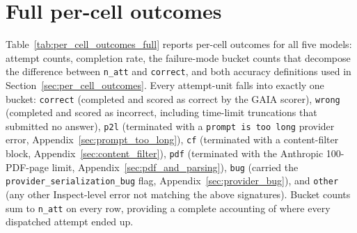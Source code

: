 \documentclass[10pt]{article} %
\begin{document}
\section{Full per-cell outcomes}\label{app:per_cell_outcomes_full}

    Table~\ref{tab:per_cell_outcomes_full} reports per-cell outcomes for all five models: attempt counts, completion rate, the failure-mode bucket counts that decompose the difference between \texttt{n\_att} and \texttt{correct}, and both accuracy definitions used in Section~\ref{sec:per_cell_outcomes}. Every attempt-unit falls into exactly one bucket: \texttt{correct} (completed and scored as correct by the GAIA scorer), \texttt{wrong} (completed and scored as incorrect, including time-limit truncations that submitted no answer), \texttt{p2l} (terminated with a \texttt{prompt is too long} provider error, Appendix~\ref{sec:prompt_too_long}), \texttt{cf} (terminated with a content-filter block, Appendix~\ref{sec:content_filter}), \texttt{pdf} (terminated with the Anthropic 100-PDF-page limit, Appendix~\ref{sec:pdf_and_parsing}), \texttt{bug} (carried the \texttt{provider\_serialization\_bug} flag, Appendix~\ref{sec:provider_bug}), and \texttt{other} (any other Inspect-level error not matching the above signatures). Bucket counts sum to \texttt{n\_att} on every row, providing a complete accounting of where every dispatched attempt ended up.
\end{document}
